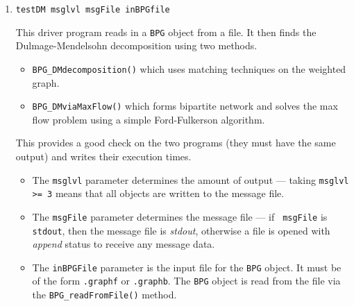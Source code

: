 \begin{enumerate}
\begin{itemize}
\end{itemize}
\item
\begin{verbatim}
testDM msglvl msgFile inBPGfile
\end{verbatim}
This driver program reads in a {\tt BPG} object from a file.
It then finds the Dulmage-Mendelsohn decomposition using two
methods.
\begin{itemize}
\item 
{\tt BPG\_DMdecomposition()} which uses matching
techniques on the weighted graph.
\item 
{\tt BPG\_DMviaMaxFlow()} which forms bipartite network and solves
the max flow problem using a simple Ford-Fulkerson algorithm.
\end{itemize}
This provides a good check on the two programs (they must have the
same output) and writes their execution times.
\begin{itemize}
\item
The {\tt msglvl} parameter determines the amount of output ---
taking {\tt msglvl >= 3} means that all objects are written
to the message file.
\item
The {\tt msgFile} parameter determines the message file --- if {\tt
msgFile} is {\tt stdout}, then the message file is {\it stdout},
otherwise a file is opened with {\it append} status to receive any
message data.
\item
The {\tt inBPGFile} parameter is the input file for the {\tt BPG}
object. It must be of the form {\tt *.graphf} or {\tt *.graphb}.
The {\tt BPG} object is read from the file via the
{\tt BPG\_readFromFile()} method.
\end{itemize}
\end{enumerate}
